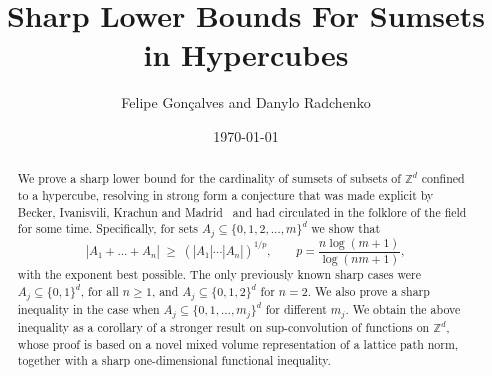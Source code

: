 \documentclass[a4paper,reqno,12pt]{amsart}
\title{Sharp Lower Bounds For Sumsets in Hypercubes}
\author[Gonçalves and Radchenko]{Felipe Gonçalves and Danylo Radchenko}
\date{\today}
\newcommand{\z}{\mathbb{Z}}
\newcommand{\1}{\bo{1}}
\begin{document}
\begin{abstract}
We prove a sharp lower bound for the cardinality of sumsets of
subsets of $\z^d$ confined to a hypercube, resolving in strong form a conjecture
that was made explicit by Becker, Ivanisvili, Krachun and
Madrid~\cite{Be-Iv-Kr-Ma} and had circulated in the folklore of the field for some time.
Specifically, for sets $A_j\subseteq \{0,1,2,\dots,m\}^d$ we show that
	\[|A_1+\dots+A_n|\;\geq\; (|A_1|\cdots|A_n|)^{1/p},
	\qquad p=\frac{n\log(m+1)}{\log(nm+1)},\]
with the exponent best possible. The only previously known sharp cases were $A_j\subseteq \{0,1\}^d$, for all $n\ge1$, and $A_j\subseteq \{0,1,2\}^d$ for $n=2$. We also prove a sharp inequality in the case when $A_j\subseteq\{0,1,\dots,m_j\}^d$ for different $m_j$.
We obtain the above inequality as a corollary of a stronger result on sup-convolution of functions on $\z^d$, whose proof is based on a novel mixed volume representation of a lattice path norm, together with a sharp one-dimensional functional inequality.
\end{abstract}

\maketitle
\end{document}
